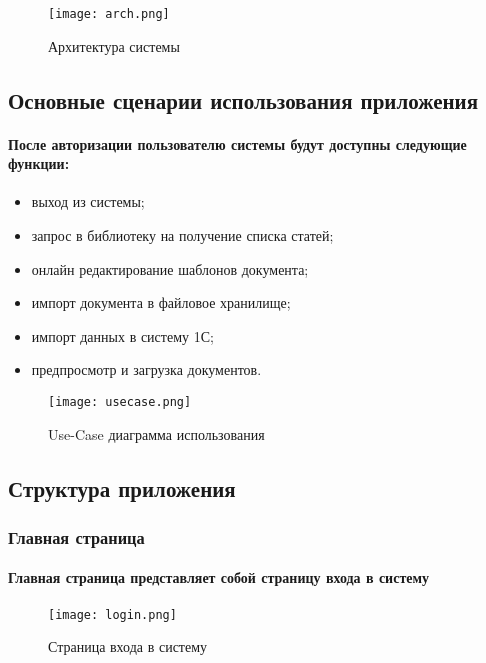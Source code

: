 \documentclass{article}
\begin{document}
        \begin{figure}[ht]
            \centering
            \texttt{[image: arch.png]}
            \caption{Архитектура системы}
            \label{fig:mpr}
        \end{figure}
    
    \subsection{Основные сценарии использования приложения}
        \paragraph{После авторизации пользователю системы будут доступны следующие функции:}
        \begin{itemize}
            \item выход из системы;
            \item запрос в библиотеку на получение списка статей;
            \item онлайн редактирование шаблонов документа;
            \item импорт документа в файловое хранилище;
            \item импорт данных в систему 1С;
            \item предпросмотр и загрузка документов.
        \end{itemize}
        
        \begin{figure}[ht]
            \centering
            \texttt{[image: usecase.png]}
            \caption{Use-Case диаграмма использования}
            \label{fig:usecase}
        \end{figure}
        
    \subsection{Структура приложения}
        \subsubsection{Главная страница}
            \paragraph{Главная страница представляет собой страницу входа в систему}
            
            \begin{figure}[ht]
                \centering
                \texttt{[image: login.png]}
                \caption{Страница входа в систему}
                \label{fig:login}
            \end{figure}
  
\end{document}
